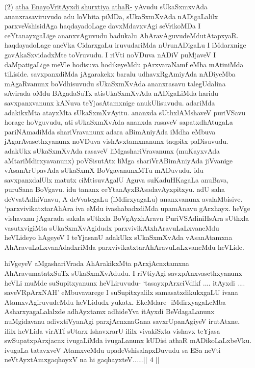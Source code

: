 \begin{artha}
(2) \underline{atha EnayoVritAyxdi shurxtiya athaR-} yAvudu sUkaSxmxvAda ananxrasaviruvudo adu loVhita piMDa, sUkaSxmXvAda nADigaLalilx parxveVshisidAga haqdayadoLage davxMdavxvAgi seVrikoMDa I ceYtanayxgaLige ananxvAguvudu badukalu AhAravAguvudeMdu\break tAtapxyaR. haqdayadoLage aneVka CidarxgaLu iruvudariMda nUrunADigaLu I iMdarxnige gavAkaSxvidadxMte toVruvudu. I riVti noVDuva nADiV puMjaveV I daMpatigaLige meVle hodisuva hodikeyeMdu pArxvaraNamf eMba mAtiniMda tiLiside. savxpanxdiMda jAgarakekx baralu udhavxRgAmiyAda nADiyeMba mAgaRvanunx boVdhisuvudu sUkaSxmXvAda ananxrasavu talegUdalina sAvirada oMdu BAgadaSuTx atisUkaSxmXvAda nADigaLiMda haridu savxpanxvanunx kANuva teYjasAtamxnige anukUlisuvudu. adariMda adakikxMta atayxMta sUkaSxmXvAyitu. ananxda sUthxlAMshaveV puriVSavu horage hoVguvudu, ati sUkaSxmXvAda ananxda rasaveV sapatxdhAtugaLa pariNAmadiMda shariVravanunx adara aBimAniyAda iMdha eMbuva jAgarAvasethxyanunx noVDuva vishAvxtamxnanunx taqpitx paDisuvudu. adakUkx sUkaSxmXvAda rasaveV liMgashariVravanunx (muKayxvAda aMtariMdirxyavanunx) poVSisutAtx liMga shariVrABimAniyAda jiVvanige vAsanArUpavAda sUkaSxmX BoVgavanunxMTu mADuvudu. idu savxpanxdalUlx matutx ciMtisuvAgalU Aguva suKaduHKagaLa anuBava, puruSana BoVgavu. idu tananx ceYtanAyxBAsadavAyxpitxyu. adU saha deVvatAdhiVnavu, A deVvategaLu (iMdirxyagaLu) ananxvanunx avalaMbisive. `parxvivikatxtarAhAra iva eMdu ivashabadxdiMda upamAnavu gArxhayx. heVge vishavxnu jAgarada sakala sUthxla BoVgAyxhAravu PuriVSAdiniHsAra sUthxla vasutxvigiMta sUkaSxmXvAgidudx parxvivikAtxhAravuLaLxvaneMdu heVLideyo hAgeyeV I teYjasanU adakUkx sUkaSxmXvAda vAsanAtamxna AhAravuLaLxvanAdadxriMda parxvivikatxtarAhAravuLaLxvaneMdu heVLide.
\end{artha}

\begin{artha}
hiVgeyeV aMgashariVrada AhArakikxMta pArxjAcnxtamxna AhAravu\break matatxSuTx sUkaSxmXvAdudu. I riVtiyAgi savxpAnxvasethxyanunx heVLi muMde suSupitxyanunx heVLiruvudu- `tasayxpArxciVdikf .... itAyxdi .... saveVRpArxNAH' eMbuvavarege I suSupitxyalilx samasatxdikukxgaLU ivana AtamxvAgiruvudeMdu heVLidudx yukatx. EkeMdare- iMdirxyagaLeMba AsharxyagaLalalxde adhAyxtamx adhideYva itAyxdi BeVdagaLanunx nuMgidavanu adivxtiVyanAgi parxjAcnxnaGana savxrUpanAgiyeV irutAtxne. ililx heVLida virATf sUtarx IshavxrarU ililx vivakiSxta vishavx teYjasa swSupatxpArxjacnx ivugaLiMda ivugaLanunx kUDisi athaR mADikoLaLxbeVku. ivugaLa tatavxveV AtamxveMdu upadeVshisalapxDuvudu sa ESa neVti neVtAyxtAmx\s gaqhoyxV na hi gaqhayxteV......|| 4 || 
\end{artha}

